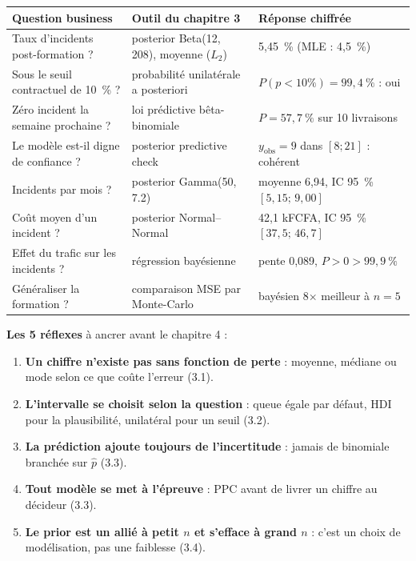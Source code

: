 \documentclass[11pt,a4paper]{article}
\begin{document}
\begin{contexte}
\begin{center}
\small
\begin{tabular}{@{}p{3.9cm} p{4.1cm} p{5.4cm}@{}}
\toprule
\textbf{Question business} & \textbf{Outil du chapitre 3} & \textbf{Réponse chiffrée} \\
\midrule
Taux d'incidents post-formation ? & posterior Beta(12, 208), moyenne ($L_2$) & 5,45~\% (MLE : 4,5~\%) \\
Sous le seuil contractuel de 10~\% ? & probabilité unilatérale a posteriori & $P(p<10\%) = 99{,}4~\%$ : oui \\
Zéro incident la semaine prochaine ? & loi prédictive bêta-binomiale & $P = 57{,}7~\%$ sur 10 livraisons \\
Le modèle est-il digne de confiance ? & posterior predictive check & $y_{\text{obs}}=9$ dans $[8; 21]$ : cohérent \\
Incidents par mois ? & posterior Gamma(50, 7.2) & moyenne 6,94, IC 95~\% $[5{,}15;\, 9{,}00]$ \\
Coût moyen d'un incident ? & posterior Normal--Normal & 42,1 kFCFA, IC 95~\% $[37{,}5;\, 46{,}7]$ \\
Effet du trafic sur les incidents ? & régression bayésienne & pente 0,089, $P>0 > 99{,}9~\%$ \\
Généraliser la formation ? & comparaison MSE par Monte-Carlo & bayésien 8$\times$ meilleur à $n=5$ \\
\bottomrule
\end{tabular}
\end{center}

\textbf{Les 5 réflexes} à ancrer avant le chapitre 4 :
\begin{enumerate}[leftmargin=5mm, itemsep=1mm]
  \item \textbf{Un chiffre n'existe pas sans fonction de perte} : moyenne,
        médiane ou mode selon ce que coûte l'erreur (3.1).
  \item \textbf{L'intervalle se choisit selon la question} : queue égale par
        défaut, HDI pour la plausibilité, unilatéral pour un seuil (3.2).
  \item \textbf{La prédiction ajoute toujours de l'incertitude} : jamais de
        binomiale branchée sur $\hat p$ (3.3).
  \item \textbf{Tout modèle se met à l'épreuve} : PPC avant de livrer un
        chiffre au décideur (3.3).
  \item \textbf{Le prior est un allié à petit $n$ et s'efface à grand $n$} :
        c'est un choix de modélisation, pas une faiblesse (3.4).
\end{enumerate}
\end{contexte}
\end{document}
